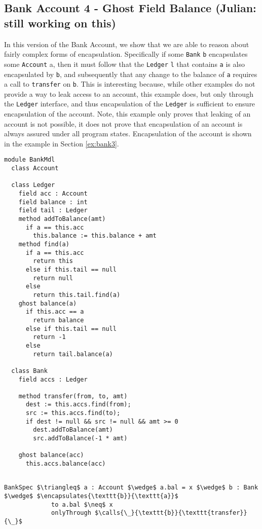 \documentclass[acmsmall,review,anonymous]{acmart}\settopmatter{printfolios=true,printccs=false,printacmref=false}
\begin{document}
\subsection{Bank Account 4 - Ghost Field Balance {\color{red}(Julian: still working on this)}} 
\label{ex:bank4}
In this version of the Bank Account, we show that we 
are able to reason about fairly complex forms of encapsulation.
Specifically if some \texttt{Bank} \texttt{b} encapsulates
some \texttt{Account} a, then it must follow that 
the \texttt{Ledger} \texttt{l} that contains \texttt{a}
is also encapsulated by \texttt{b}, and subsequently that any change to
the balance of \texttt{a} requires a call to \texttt{transfer}
on \texttt{b}. This is interesting because, while other examples
do not provide a way to leak access to an account, this example 
does, but only through the \texttt{Ledger} interface, and thus
encapsulation of the \texttt{Ledger} is sufficient to ensure
encapsulation of the account. Note, this example only proves 
that leaking of an account is not possible, it does not prove 
that encapsulation of an account is always assured under all 
program states. Encapsulation of the account is shown in the
example in Section \ref{ex:bank3}.
\begin{lstlisting}[mathescape=true, frame=lines]
module BankMdl
  class Account

  class Ledger
    field acc : Account
    field balance : int
    field tail : Ledger
    method addToBalance(amt)
      if a == this.acc
        this.balance := this.balance + amt
    method find(a)
      if a == this.acc
        return this
      else if this.tail == null
        return null
      else
        return this.tail.find(a)
    ghost balance(a)
      if this.acc == a
        return balance
      else if this.tail == null
        return -1
      else 
        return tail.balance(a)

  class Bank
    field accs : Ledger
    
    method transfer(from, to, amt)
      dest := this.accs.find(from);
      src := this.accs.find(to);
      if dest != null && src != null && amt >= 0
        dest.addToBalance(amt)
        src.addToBalance(-1 * amt)
        
    ghost balance(acc) 
      this.accs.balance(acc)
      
\end{lstlisting}
\begin{lstlisting}[language = Chainmail, mathescape=true, frame=lines]
BankSpec $\triangleq$ a : Account $\wedge$ a.bal = x $\wedge$ b : Bank $\wedge$ $\encapsulates{\texttt{b}}{\texttt{a}}$
             to a.bal $\neq$ x
             onlyThrough $\calls{\_}{\texttt{b}}{\texttt{transfer}}{\_}$
\end{lstlisting}
\end{document}
